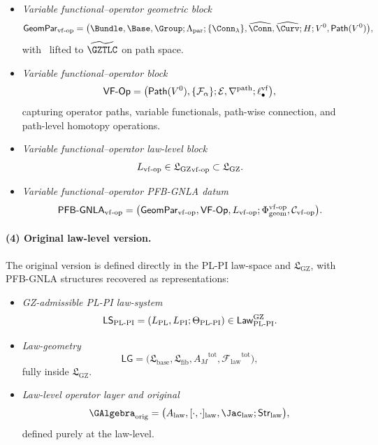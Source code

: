 \documentclass[11pt]{book}
\theoremstyle{plain}
\theoremstyle{definition}
\newcommand{\GZLS}{\ensuremath{\mathfrak{L}_{\mathrm{GZ}}}}       \newcommand{\GZLT}{\ensuremath{M_{!w}}}                           \newcommand{\GZLOC}{\ensuremath{A_M}}                             \newcommand{\GZLCurv}{\ensuremath{\mathcal{F}_{\mathrm{law}}}}
\begin{document}
\begin{itemize}
  \item \emph{Variable functional--operator geometric block}
    \[
      \mathsf{GeomPar}_{\mathrm{vf\text- op}}
      =
      \bigl(
        \Bundle,\Base,\Group;
        \Lambda_{\mathrm{par}};
        \{\Conn_\lambda\},
        \widehat{\Conn},\widehat{\Curv};
        H;
        V^0,\mathsf{Path}(V^0)
      \bigr),
    \]
    with \GZTLC\ lifted to $\widetilde{\GZTLC}$ on path space.
  \item \emph{Variable functional--operator block}
    \[
      \mathsf{VF\text- Op}
      =
      \bigl(
        \mathsf{Path}(V^0),
        \{\mathcal{F}_\alpha\};
        \mathcal{E},
        \nabla^{\mathrm{path}};
        \ell_\bullet^{\mathrm{vf}}
      \bigr),
    \]
    capturing operator paths, variable functionals, path-wise
    connection, and path-level homotopy operations.
  \item \emph{Variable functional--operator law-level block}
    \[
      L_{\mathrm{vf\text- op}}
      \in
      {\GZLS}_{\mathrm{vf\text- op}}
      \subset\GZLS.
    \]
  \item \emph{Variable functional--operator PFB-GNLA datum}
    \[
      \mathsf{PFB\text- GNLA}_{\mathrm{vf\text- op}}
      =
      \bigl(
        \mathsf{GeomPar}_{\mathrm{vf\text- op}},
        \mathsf{VF\text- Op},
        L_{\mathrm{vf\text- op}};
        \Phi_{\mathrm{geom}}^{\mathrm{vf\text- op}},
        \mathcal{C}_{\mathrm{vf\text- op}}
      \bigr).
    \]
\end{itemize}

\paragraph{(4) Original law-level version.}

The original version is defined directly in the PL-PI law-space and
\GZLS, with PFB-GNLA structures recovered as representations:

\begin{itemize}
  \item \emph{GZ-admissible PL-PI law-system}
    \[
      \mathsf{LS}_{\mathrm{PL\text- PI}}
      =
      (L_{\mathrm{PL}},L_{\mathrm{PI}};
       \Theta_{\mathrm{PL\text- PI}})
      \in
      \mathsf{Law}_{\mathrm{PL\text- PI}}^{\mathrm{GZ}}.
    \]
  \item \emph{Law-geometry}
    \[
      \mathsf{LG}
      =
      \bigl(
        \mathfrak{L}_{\mathrm{base}},
        \mathfrak{L}_{\mathrm{fib}},
        \GZLOC^{\mathrm{tot}},
        \GZLCurv^{\mathrm{tot}}
      \bigr),
    \]
    fully inside \GZLS.
  \item \emph{Law-level operator layer and original \GAlgebra}
    \[
      \GAlgebra_{\mathrm{orig}}
      =
      \bigl(
        A_{\mathrm{law}},
        [\cdot,\cdot]_{\mathrm{law}},
        \Jac_{\mathrm{law}};
        \mathsf{Str}_{\mathrm{law}}
      \bigr),
    \]
    defined purely at the law-level.
\end{itemize}
\end{document}
